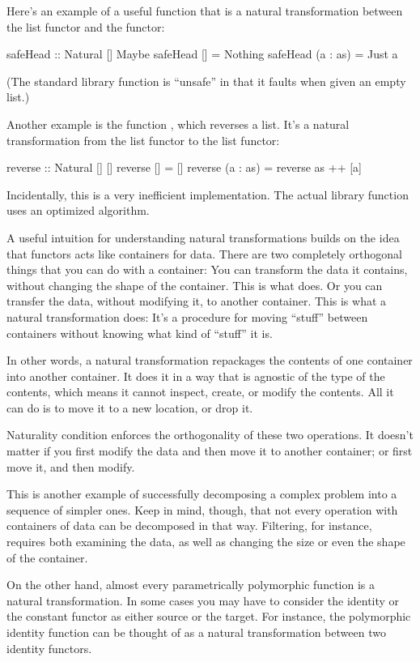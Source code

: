 \documentclass[DaoFP]{subfiles}
\begin{document}
Here's an example of a useful function that is a natural transformation between the list functor and the  functor:
\begin{haskell}
safeHead :: Natural [] Maybe
safeHead [] = Nothing
safeHead (a : as) = Just a
\end{haskell}
(The standard library  function is ``unsafe'' in that it faults when given an empty list.)

Another example is the function , which reverses a list. It's a natural transformation from the list functor to the list functor:
\begin{haskell}
reverse :: Natural [] []
reverse [] = []
reverse (a : as) = reverse as ++ [a]
\end{haskell}
Incidentally, this is a very inefficient implementation. The actual library function uses an optimized algorithm.

A useful intuition for understanding natural transformations builds on the idea that functors acts like containers for data. There are two completely orthogonal things that you can do with a container: You can transform the data it contains, without changing the shape of the container. This is what  does. Or you can transfer the data, without modifying it, to another container. This is what a natural transformation does: It's a procedure for moving ``stuff'' between containers without knowing what kind of ``stuff'' it is. 

In other words, a natural transformation repackages the contents of one container into another container. It does it in a way that is agnostic of the type of the contents, which means it cannot inspect, create, or modify the contents. All it can do is to move it to a new location, or drop it. 

Naturality condition enforces the orthogonality of these two operations. It doesn't matter if you first modify the data and then move it to another container; or first move it, and then modify. 

This is another example of successfully decomposing a complex problem into a sequence of simpler ones. Keep in mind, though, that not every operation with containers of data can be decomposed in that way. Filtering, for instance, requires both examining the data, as well as changing the size or even the shape of the container. 

On the other hand, almost every parametrically polymorphic function is a natural transformation. In some cases you may have to consider the identity or the constant functor as either source or the target. For instance, the polymorphic identity function can be thought of as a natural transformation between two identity functors.
\end{document}
